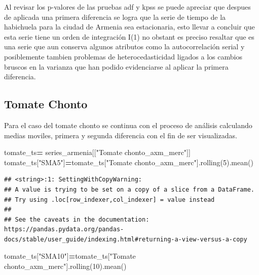\documentclass[
]{book}
\newenvironment{Shaded}{\begin{snugshade}}{\end{snugshade}}
\newcommand{\DecValTok}[1]{\textcolor[rgb]{0.00,0.00,0.81}{#1}}
\newcommand{\NormalTok}[1]{#1}
\newcommand{\OperatorTok}[1]{\textcolor[rgb]{0.81,0.36,0.00}{\textbf{#1}}}
\newcommand{\StringTok}[1]{\textcolor[rgb]{0.31,0.60,0.02}{#1}}
\begin{document}
Al revisar los p-valores de las pruebas adf y kpss se puede apreciar que despues de aplicada una primera diferencia se logra que la serie de tiempo de la habichuela para la ciudad de Armenia sea estacionaria, esto llevar a concluir que esta serie tiene un orden de integración I(1) no obstant es preciso resaltar que es una serie que aun conserva algunos atributos como la autocorrelación serial y posiblemente tambien problemas de heterocedasticidad ligados a los cambios bruscos en la varianza que han podido evidenciarse al aplicar la primera diferencia.

\hypertarget{tomate-chonto}{%
\subsection{Tomate Chonto}\label{tomate-chonto}}

Para el caso del tomate chonto se continua con el proceso de análisis calculando medias moviles, primera y segunda diferencia con el fin de ser visualizadas.

\begin{Shaded}
\begin{Highlighting}[]

\NormalTok{tomate\_ts}\OperatorTok{=}\NormalTok{ series\_armenia[[}\StringTok{"Tomate chonto\_axm\_merc"}\NormalTok{]]}
\NormalTok{tomate\_ts[}\StringTok{"SMA5"}\NormalTok{]}\OperatorTok{=}\NormalTok{tomate\_ts[}\StringTok{"Tomate chonto\_axm\_merc"}\NormalTok{].rolling(}\DecValTok{5}\NormalTok{).mean()}
\end{Highlighting}
\end{Shaded}

\begin{verbatim}
## <string>:1: SettingWithCopyWarning: 
## A value is trying to be set on a copy of a slice from a DataFrame.
## Try using .loc[row_indexer,col_indexer] = value instead
## 
## See the caveats in the documentation: https://pandas.pydata.org/pandas-docs/stable/user_guide/indexing.html#returning-a-view-versus-a-copy
\end{verbatim}

\begin{Shaded}
\begin{Highlighting}[]
\NormalTok{tomate\_ts[}\StringTok{"SMA10"}\NormalTok{]}\OperatorTok{=}\NormalTok{tomate\_ts[}\StringTok{"Tomate chonto\_axm\_merc"}\NormalTok{].rolling(}\DecValTok{10}\NormalTok{).mean()}
\end{Highlighting}
\end{Shaded}
\end{document}
